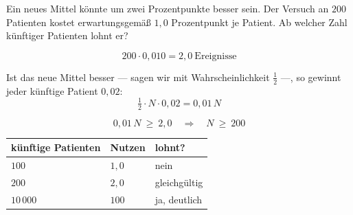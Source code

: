 \begin{aufgabe}
Ein neues Mittel könnte um zwei Prozentpunkte besser sein. Der Versuch an $200$ Patienten kostet erwartungsgemäß $1{,}0$ Prozentpunkt je Patient. Ab welcher Zahl künftiger Patienten lohnt er?

\loesung
{}
\[ 200\cdot0{,}010 = 2{,}0 \ \text{Ereignisse} \]

Ist das neue Mittel besser --- sagen wir mit Wahrscheinlichkeit $\tfrac12$ ---, so gewinnt jeder künftige Patient $0{,}02$:
\[ \tfrac12\cdot N\cdot0{,}02 = 0{,}01\,N \]

\[ 0{,}01\,N \ \ge\ 2{,}0 \quad\Longrightarrow\quad N \ \ge\ 200 \]

\begin{center}
{\small
\renewcommand{\arraystretch}{1.48}
\begin{tabular}{@{}P{2.6cm}P{2.4cm}P{2.4cm}@{}}
\toprule
\textbf{künftige Patienten} & \textbf{Nutzen} & \textbf{lohnt?}\\
\midrule
$100$ & $1{,}0$ & nein\\
$200$ & $2{,}0$ & gleichgültig\\
$10\,000$ & $100$ & ja, deutlich\\
\bottomrule
\end{tabular}}
\end{center}

\begin{center}
\begin{minipage}{0.88\textwidth}
\end{minipage}
\end{center}
\end{aufgabe}

